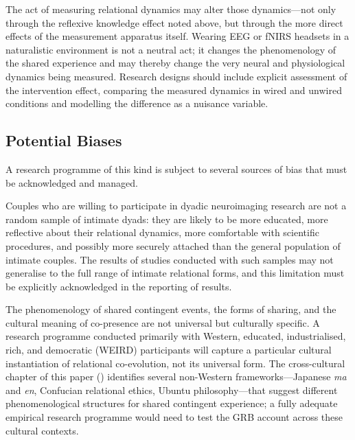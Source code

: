  The act of measuring relational dynamics may alter those dynamics---not only through the reflexive knowledge effect noted above, but through the more direct effects of the measurement apparatus itself. Wearing EEG or fNIRS headsets in a naturalistic environment is not a neutral act; it changes the phenomenology of the shared experience and may thereby change the very neural and physiological dynamics being measured. Research designs should include explicit assessment of the intervention effect, comparing the measured dynamics in wired and unwired conditions and modelling the difference as a nuisance variable.

\subsection{Potential Biases}
\label{p14:subsec:bias}

\noindent
A research programme of this kind is subject to several sources of bias that must be acknowledged and managed.

 Couples who are willing to participate in dyadic neuroimaging research are not a random sample of intimate dyads: they are likely to be more educated, more reflective about their relational dynamics, more comfortable with scientific procedures, and possibly more securely attached than the general population of intimate couples. The results of studies conducted with such samples may not generalise to the full range of intimate relational forms, and this limitation must be explicitly acknowledged in the reporting of results.

 The phenomenology of shared contingent events, the forms of sharing, and the cultural meaning of co-presence are not universal but culturally specific. A research programme conducted primarily with Western, educated, industrialised, rich, and democratic (WEIRD) participants \parencite{henrich2010} will capture a particular cultural instantiation of relational co-evolution, not its universal form. The cross-cultural chapter of this paper () identifies several non-Western frameworks---Japanese \emph{ma} and \emph{en}, Confucian relational ethics, Ubuntu philosophy---that suggest different phenomenological structures for shared contingent experience; a fully adequate empirical research programme would need to test the GRB account across these cultural contexts.

